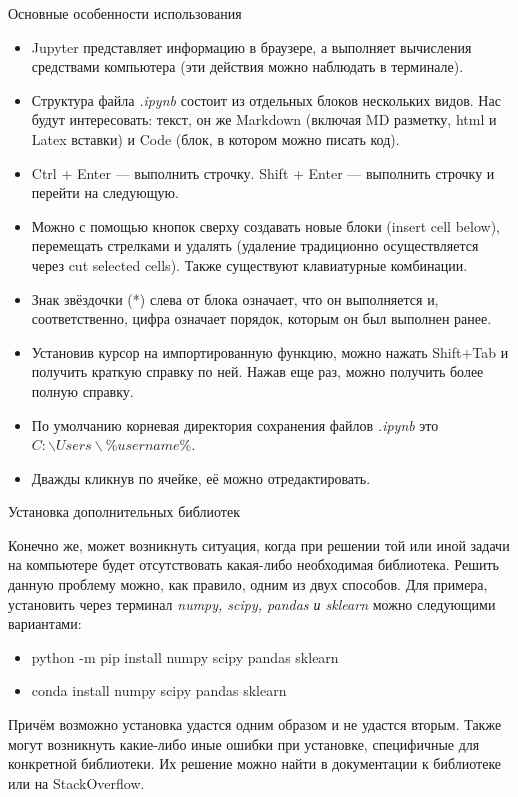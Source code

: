 \documentclass[8pt,pdf,hyperref={unicode}, xcolor=dvipsnames, fleqn]{beamer}
\begin{document}
\begin{frame}{Основные особенности использования}

\begin{itemize}
	\item Jupyter представляет информацию в браузере, а выполняет вычисления средствами компьютера (эти действия можно наблюдать в терминале).
	\item Структура файла \textit{.ipynb} состоит из отдельных блоков нескольких видов. Нас будут интересовать: текст, он же Markdown (включая MD разметку, html и Latex вставки) и Code (блок, в котором можно писать код).
	\item Ctrl + Enter — выполнить строчку. Shift + Enter — выполнить строчку и перейти на следующую.
	\item Можно с помощью кнопок сверху создавать новые блоки (insert cell below), перемещать стрелками и удалять (удаление традиционно осуществляется через cut selected cells). Также существуют клавиатурные комбинации.
	\item Знак звёздочки (*) слева от блока означает, что он выполняется и, соответственно, цифра означает порядок, которым он был выполнен ранее.
	\item Установив курсор на импортированную функцию, можно нажать Shift+Tab и получить краткую справку по ней. Нажав еще раз, можно получить более полную справку.
	\item По умолчанию корневая директория сохранения файлов \textit{.ipynb} это $ C:\backslash Users\backslash \%username\% $.
	\item Дважды кликнув по ячейке, её можно отредактировать.
\end{itemize}


\end{frame}
\begin{frame}{Установка дополнительных библиотек}

Конечно же, может возникнуть ситуация, когда при решении той или иной задачи на компьютере будет отсутствовать какая-либо необходимая библиотека. Решить данную проблему можно, как правило, одним из двух способов. Для примера, установить через терминал \textit{numpy, scipy, pandas и sklearn} можно следующими вариантами:

\begin{itemize}
	\item python -m pip install numpy scipy pandas sklearn
	\item conda install numpy scipy pandas sklearn
\end{itemize}
Причём возможно установка удастся одним образом и не удастся вторым. Также могут возникнуть какие-либо иные ошибки при установке, специфичные для конкретной библиотеки. Их решение можно найти в документации к библиотеке или на StackOverflow.

\end{frame}
\end{document}
